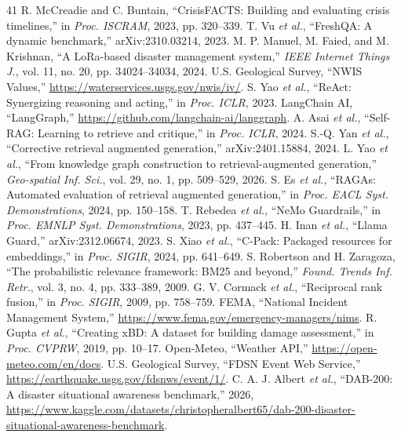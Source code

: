 \documentclass[conference]{IEEEtran}
\begin{document}
\begin{thebibliography}{41}
 R. McCreadie and C. Buntain, ``CrisisFACTS: Building and evaluating crisis timelines,'' in \textit{Proc. ISCRAM}, 2023, pp. 320--339.
 T. Vu \textit{et al.}, ``FreshQA: A dynamic benchmark,'' arXiv:2310.03214, 2023.
 M. P. Manuel, M. Faied, and M. Krishnan, ``A LoRa-based disaster management system,'' \textit{IEEE Internet Things J.}, vol. 11, no. 20, pp. 34024--34034, 2024.
 U.S. Geological Survey, ``NWIS Values,'' \url{https://waterservices.usgs.gov/nwis/iv/}.
 S. Yao \textit{et al.}, ``ReAct: Synergizing reasoning and acting,'' in \textit{Proc. ICLR}, 2023.
 LangChain AI, ``LangGraph,'' \url{https://github.com/langchain-ai/langgraph}.
 A. Asai \textit{et al.}, ``Self-RAG: Learning to retrieve and critique,'' in \textit{Proc. ICLR}, 2024.
 S.-Q. Yan \textit{et al.}, ``Corrective retrieval augmented generation,'' arXiv:2401.15884, 2024.
 L. Yao \textit{et al.}, ``From knowledge graph construction to retrieval-augmented generation,'' \textit{Geo-spatial Inf. Sci.}, vol. 29, no. 1, pp. 509--529, 2026.
 S. Es \textit{et al.}, ``RAGAs: Automated evaluation of retrieval augmented generation,'' in \textit{Proc. EACL Syst. Demonstrations}, 2024, pp. 150--158.
 T. Rebedea \textit{et al.}, ``NeMo Guardrails,'' in \textit{Proc. EMNLP Syst. Demonstrations}, 2023, pp. 437--445.
 H. Inan \textit{et al.}, ``Llama Guard,'' arXiv:2312.06674, 2023.
 S. Xiao \textit{et al.}, ``C-Pack: Packaged resources for embeddings,'' in \textit{Proc. SIGIR}, 2024, pp. 641--649.
 S. Robertson and H. Zaragoza, ``The probabilistic relevance framework: BM25 and beyond,'' \textit{Found. Trends Inf. Retr.}, vol. 3, no. 4, pp. 333--389, 2009.
 G. V. Cormack \textit{et al.}, ``Reciprocal rank fusion,'' in \textit{Proc. SIGIR}, 2009, pp. 758--759.
 FEMA, ``National Incident Management System,'' \url{https://www.fema.gov/emergency-managers/nims}.
 R. Gupta \textit{et al.}, ``Creating xBD: A dataset for building damage assessment,'' in \textit{Proc. CVPRW}, 2019, pp. 10--17.
 Open-Meteo, ``Weather API,'' \url{https://open-meteo.com/en/docs}.
 U.S. Geological Survey, ``FDSN Event Web Service,'' \url{https://earthquake.usgs.gov/fdsnws/event/1/}.
 C. A. J. Albert \textit{et al.}, ``DAB-200: A disaster situational awareness benchmark,'' 2026, \url{https://www.kaggle.com/datasets/christopheralbert65/dab-200-disaster-situational-awareness-benchmark}.

\end{thebibliography}
\end{document}

